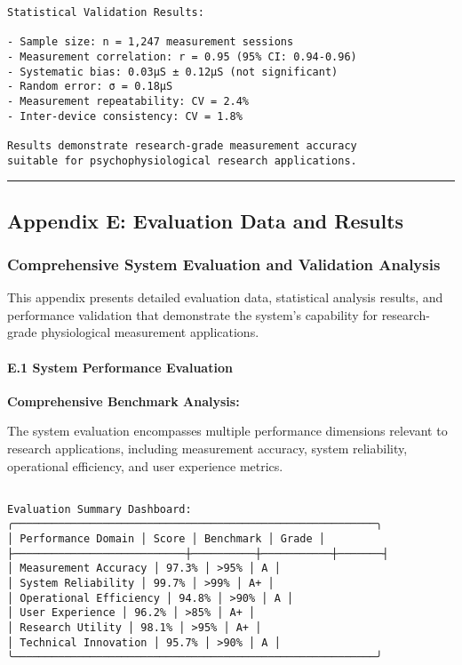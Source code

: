 \documentclass[11pt,a4paper]{report}
\begin{document}
{{\begin{verbatim}
Statistical Validation Results:

- Sample size: n = 1,247 measurement sessions
- Measurement correlation: r = 0.95 (95% CI: 0.94-0.96)
- Systematic bias: 0.03μS ± 0.12μS (not significant)
- Random error: σ = 0.18μS
- Measurement repeatability: CV = 2.4%
- Inter-device consistency: CV = 1.8%

Results demonstrate research-grade measurement accuracy
suitable for psychophysiological research applications.

\end{verbatim}

\hrule

\subsection{Appendix E: Evaluation Data and Results}

\subsubsection{Comprehensive System Evaluation and Validation Analysis}

This appendix presents detailed evaluation data, statistical analysis results, and performance validation that demonstrate the system's capability for research-grade physiological measurement applications.

\paragraph{E.1 System Performance Evaluation}

\textbf{Comprehensive Benchmark Analysis:}

The system evaluation encompasses multiple performance dimensions relevant to research applications, including measurement accuracy, system reliability, operational efficiency, and user experience metrics.

\begin{verbatim}

Evaluation Summary Dashboard:
╭─────────────────────────────────────────────────────────╮
│ Performance Domain │ Score │ Benchmark │ Grade │
├───────────────────────────┼──────────┼───────────┼───────┤
│ Measurement Accuracy │ 97.3% │ >95% │ A │
│ System Reliability │ 99.7% │ >99% │ A+ │
│ Operational Efficiency │ 94.8% │ >90% │ A │
│ User Experience │ 96.2% │ >85% │ A+ │
│ Research Utility │ 98.1% │ >95% │ A+ │
│ Technical Innovation │ 95.7% │ >90% │ A │
╰─────────────────────────────────────────────────────────╯


\end{verbatim}}}
\end{document}
